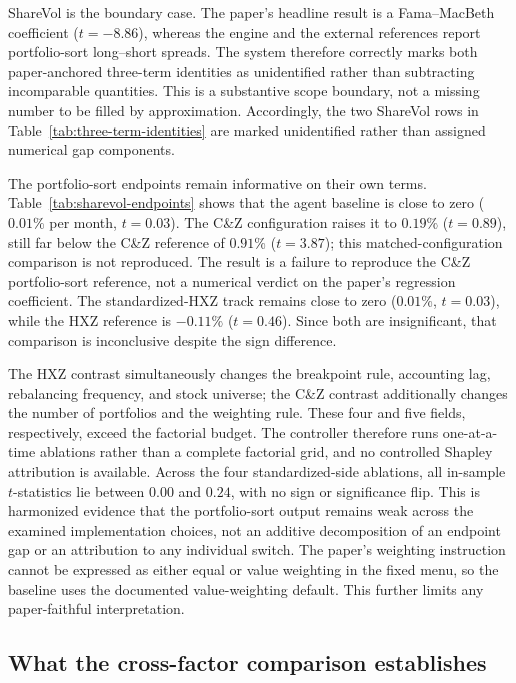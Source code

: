 ShareVol \citep{DatarNaikRadcliffe1998} is the boundary case. The paper's
headline result is a Fama--MacBeth coefficient ($t=-8.86$), whereas the
engine and the external references report portfolio-sort long--short spreads.
The system therefore correctly marks both paper-anchored three-term identities
as unidentified rather than subtracting incomparable quantities. This is a
substantive scope boundary, not a missing number to be filled by
approximation. Accordingly, the two ShareVol rows in
Table~\ref{tab:three-term-identities} are marked unidentified rather than
assigned numerical gap components.

The portfolio-sort endpoints remain informative on their own terms.
Table~\ref{tab:sharevol-endpoints} shows that the agent baseline is close to
zero ($0.01\%$ per month, $t=0.03$). The C\&Z configuration raises it to
$0.19\%$ ($t=0.89$), still far below the C\&Z reference of $0.91\%$
($t=3.87$); this matched-configuration comparison is not reproduced. The
result is a failure to reproduce the C\&Z portfolio-sort reference, not a
numerical verdict on the paper's regression coefficient. The
standardized-HXZ track remains close to zero ($0.01\%$, $t=0.03$), while the
HXZ reference is $-0.11\%$ ($t=0.46$). Since both are insignificant, that
comparison is inconclusive despite the sign difference.

The HXZ contrast simultaneously changes the breakpoint rule, accounting lag,
rebalancing frequency, and stock universe; the C\&Z contrast additionally
changes the number of portfolios and the weighting rule. These four and five
fields, respectively, exceed the factorial budget. The controller therefore
runs one-at-a-time ablations rather than a complete factorial grid, and no
controlled Shapley attribution is available. Across the four standardized-side
ablations, all in-sample $t$-statistics lie between $0.00$ and $0.24$, with no
sign or significance flip. This is harmonized evidence that the portfolio-sort
output remains weak across the examined implementation choices, not an additive
decomposition of an endpoint gap or an attribution to any individual switch.
The paper's weighting instruction cannot be expressed
as either equal or value weighting in the fixed menu, so the baseline uses the
documented value-weighting default. This further limits any paper-faithful
interpretation.




\subsection{What the cross-factor comparison establishes}

